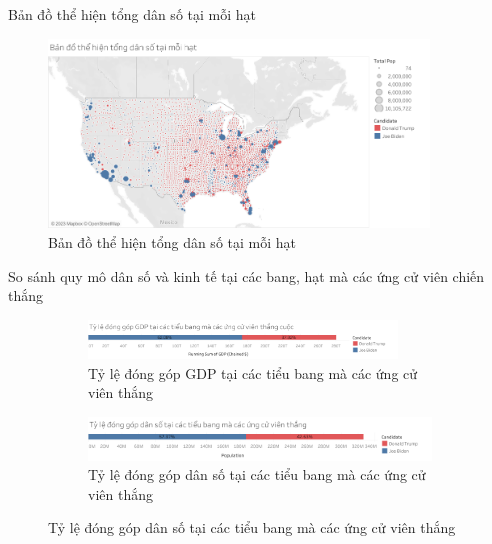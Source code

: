 \documentclass[10pt]{beamer}
\theoremstyle{remark}
\theoremstyle{definition}
\begin{document}
\begin{frame}{Bản đồ thể hiện tổng dân số tại mỗi hạt}
	\begin{figure}[h!]
        \centering
        \includegraphics[width=0.9\textwidth]{figures/County_Total_Population_Circle.png}
        \caption{Bản đồ thể hiện tổng dân số tại mỗi hạt}
    \end{figure}
\end{frame}

\begin{frame}{So sánh quy mô dân số và kinh tế tại các bang, hạt mà các ứng cử viên chiến thắng}
	\begin{figure}[h!]
        \centering
        \begin{subfigure}[b]{\textwidth}
            \includegraphics[width=0.9\textwidth]{State_Percentage_GDP_Candidate.png}
            \caption{Tỷ lệ đóng góp GDP tại các tiểu bang mà các ứng cử viên thắng}
        \end{subfigure}
        \vfill
        \begin{subfigure}[b]{\linewidth}
            \includegraphics[width=0.9\linewidth]{State_Percentage_Population_Candidate.png}
            \caption{Tỷ lệ đóng góp dân số tại các tiểu bang mà các ứng cử viên thắng}
        \end{subfigure}
    \end{figure}
	
\end{frame}
\end{document}
